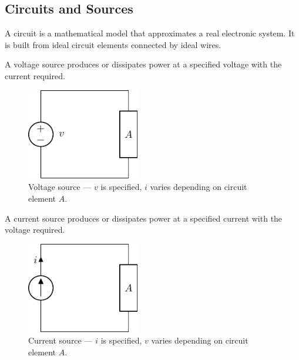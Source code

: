 \documentclass{article}
\begin{document}
\subsection{Circuits and Sources}
\begin{definition}[Circuits]
    A circuit is a mathematical model that approximates a real electronic system. It is built from ideal circuit elements connected by ideal wires.
\end{definition}
\begin{definition}
    A voltage source produces or dissipates power at a specified voltage with the current required.
\end{definition}
\begin{figure}[H]
    \centering
    \includegraphics[height = 4cm, keepaspectratio = true]{figures/voltage_source.pdf}
    \caption{Voltage source --- \(v\) is specified, \(i\) varies depending on circuit element \(A\).}
\end{figure}
\begin{definition}
    A current source produces or dissipates power at a specified current with the voltage required.
\end{definition}
\begin{figure}[H]
    \centering
    \includegraphics[height = 4cm, keepaspectratio = true]{figures/current_source.pdf}
    \caption{Current source --- \(i\) is specified, \(v\) varies depending on circuit element \(A\).}
\end{figure}
\end{document}
